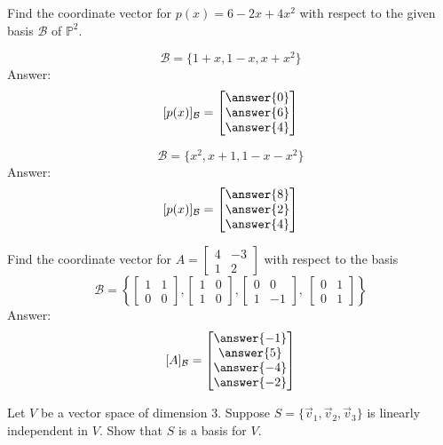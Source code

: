 \documentclass{ximera}
\begin{document}
\begin{problem}
Find the coordinate vector for $p(x)=6-2x+4x^2$ with respect to the given basis $\mathcal{B}$ of $\mathbb{P}^2$.

\begin{problem}\label{prob:coordvectors1}
$$\mathcal{B}=\{1 + x, 1 - x, x + x^{2}\}$$
Answer:
$$[p(x)]_{\mathcal{B}}=\begin{bmatrix}\answer{0}\\\answer{6}\\\answer{4}\end{bmatrix}$$
\end{problem}

\begin{problem}\label{prob:coordvectors2}
$$\mathcal{B}=\{x^{2}, x + 1, 1 - x - x^{2}\}$$
Answer:
$$[p(x)]_{\mathcal{B}}=\begin{bmatrix}\answer{8}\\\answer{2}\\\answer{4}\end{bmatrix}$$
\end{problem}
\end{problem}
\begin{problem}\label{prob:coordvectors3}
Find the coordinate vector for $A=\begin{bmatrix}4&-3\\1&2\end{bmatrix}$ with respect to the basis
$$\mathcal{B}=
\left\{
\begin{bmatrix}
1 & 1 \\
0 & 0
\end{bmatrix}
, 
\begin{bmatrix}
1 & 0 \\
1 & 0
\end{bmatrix}
, 
\begin{bmatrix}
0 & 0 \\
1 & -1
\end{bmatrix}
,\
\begin{bmatrix}
0 & 1 \\
0 & 1
\end{bmatrix}
\right\}$$ 
Answer:
$$[A]_{\mathcal{B}}=\begin{bmatrix}\answer{-1}\\\answer{5}\\\answer{-4}\\\answer{-2}\end{bmatrix}$$
\end{problem}

\begin{problem}\label{prob:basisforabstractvectspace}
Let $V$ be a vector space of dimension $3$.  Suppose $S=\{\vec{v}_1, \vec{v}_2, \vec{v}_3\}$ is linearly independent in $V$.  Show that $S$ is a basis for $V$.
\end{problem}
\end{document}
